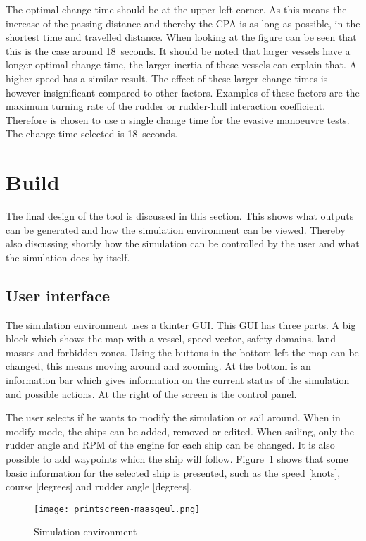 The optimal change time should be at the upper left corner. As this means the increase of the passing distance and thereby the CPA is as long as possible, in the shortest time and travelled distance. When looking at the figure can be seen that this is the case around 18~seconds. It should be noted that larger vessels have a longer optimal change time, the larger inertia of these vessels can explain that. A higher speed has a similar result. The effect of these larger change times is however insignificant compared to other factors. Examples of these factors are the maximum turning rate of the rudder or rudder-hull interaction coefficient. Therefore is chosen to use a single change time for the evasive manoeuvre tests. The change time selected is 18~seconds.

\section{Build}
The final design of the tool is discussed in this section. This shows what outputs can be generated and how the simulation environment can be viewed. Thereby also discussing shortly how the simulation can be controlled by the user and what the simulation does by itself.

\subsection{User interface}
The simulation environment uses a tkinter GUI. This GUI has three parts. A big block which shows the map with a vessel, speed vector, safety domains, land masses and forbidden zones. Using the buttons in the bottom left the map can be changed, this means moving around and zooming. At the bottom is an information bar which gives information on the current status of the simulation and possible actions. At the right of the screen is the control panel.

The user selects if he wants to modify the simulation or sail around. When in modify mode, the ships can be added, removed or edited. When sailing, only the rudder angle and RPM of the engine for each ship can be changed. It is also possible to add waypoints which the ship will follow. Figure~\ref{fig:printscreen-tool2} shows that some basic information for the selected ship is presented, such as the speed [knots], course [degrees] and rudder angle [degrees].

\begin{figure}[p]
	\centering
	\texttt{[image: printscreen-maasgeul.png]}
	\caption{Simulation environment}
	\label{fig:printscreen-tool2}
\end{figure}

